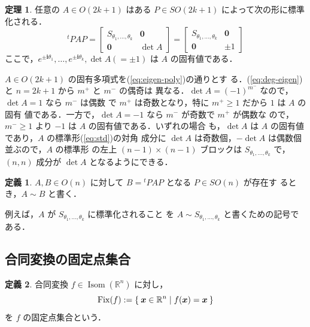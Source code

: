 \documentclass[11pt, uplatex, dvipdfmx, titlepage]{jsarticle}
\makeatletter
\renewcommand{\i}{\mathbf{i}}
\DeclareMathOperator{\Isom}{Isom}
\DeclareMathOperator{\Fix}{Fix}
\renewenvironment{proof}[1][\proofname]{\par
  \pushQED{\qed}%
  \normalfont \topsep6\p@\@plus6\p@\relax
  \trivlist
  \item[\hskip\labelsep
         \bfseries
    {#1}]\ignorespaces
}{%
  \popQED\endtrivlist\@endpefalse
}
\theoremstyle{definition}
\newtheorem{theorem}{定理}[section]
\newtheorem*{definition}{定義}
\renewcommand{\proofname}{\textbf{証明}}
\makeatother
\begin{document}
\begin{theorem}
  任意の $A \in O(2k+1)$ はある $P \in SO(2k+1)$ によって次の形に標準化される．
  \[
    {}^{t}PAP = \left[
      \begin{array}{cc}
        S_{\theta_1, \ldots, \theta_k} & \bm{0}\\
        \bm{0} & \det A
      \end{array}
    \right] = \left[
      \begin{array}{cr}
        S_{\theta_1, \ldots, \theta_k} & \bm{0}\\
        \bm{0} & \pm 1
      \end{array}
    \right]
  \]
  ここで，$e^{\pm \i \theta_1}, \ldots, e^{\pm \i \theta_k}, \det A (=\pm 1)$ は $A$ の固有値である．
\end{theorem}

\begin{proof}
  $A \in O(2k+1)$ の固有多項式を(\ref{eq:eigen-poly})の通りとす
  る．(\ref{eq:deg-eigen}) と $n=2k+1$ から $m^{+}$ と $m^{-}$ の偶奇は
  異なる．$\det A=(-1)^{m^-}$ なので，$\det A=1$ なら $m^{-}$ は偶数
  で $m^{+}$ は奇数となり，特に $m^{+} \geq 1$ だから $1$ は $A$ の固有
  値である．一方で，$\det A=-1$ なら $m^{-}$ が奇数で $m^{+}$ が偶数な
  ので，$m^{-} \geq 1$ より $-1$ は $A$ の固有値である．いずれの場合
  も，$\det A$ は $A$ の固有値であり，$A$ の標準形(\ref{eq:std})の対角
  成分に $\det A$ は奇数個，$-\det A$ は偶数個並ぶので，$A$ の標準形
  の左上 $(n-1) \times (n-1)$ ブロックは $S_{\theta_1, \ldots,
    \theta_k}$ で，$(n,n)$ 成分が $\det A$ となるようにできる．
\end{proof}

\begin{definition}
  $A, B \in O(n)$ に対して $B={}^{t}PAP$ となる $P \in SO(n)$ が存在す
  るとき，$A \sim B$ と書く．
\end{definition}

例えば，$A$ が $S_{\theta_1, \ldots, \theta_k}$ に標準化されること
を $A \sim S_{\theta_1, \ldots, \theta_k}$ と書くための記号である．

\subsection{合同変換の固定点集合}\label{sec:invariants}

\begin{definition}
  合同変換 $f \in \Isom(\mathbb{R}^n)$ に対し，
  \[
    \Fix(f) := \Set{\bm{x} \in \mathbb{R}^n | f(\bm{x}) = \bm{x}}
  \]
  を $f$ の固定点集合という．  
\end{definition}
\end{document}
